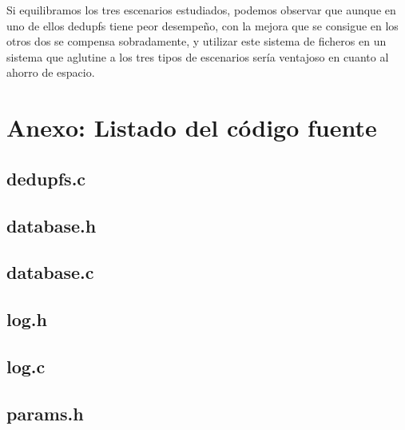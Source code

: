 \documentclass[12pt,a4paper]{article}
\begin{document}
Si equilibramos los tres escenarios estudiados, podemos observar que aunque en uno de ellos dedupfs tiene peor desempeño, con la mejora que se consigue en los otros dos se compensa sobradamente, y utilizar este sistema de ficheros en un sistema que aglutine a los tres tipos de escenarios sería ventajoso en cuanto al ahorro de espacio.



\newpage
\section{Anexo: Listado del código fuente}

\subsection{dedupfs.c}

\subsection{database.h}

\subsection{database.c}

\subsection{log.h}

\subsection{log.c}

\subsection{params.h}
\end{document}
